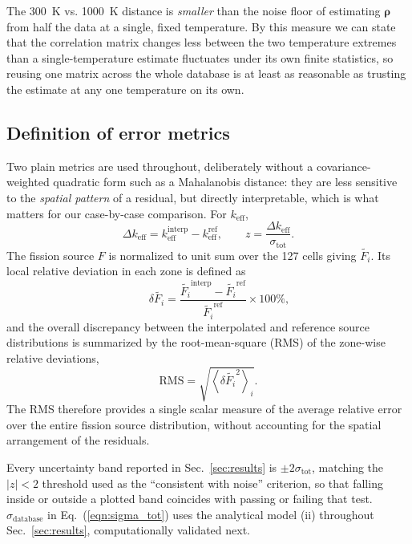 \documentclass{style/nseJournal}
\begin{document}
The 300~K vs. 1000~K distance is \emph{smaller} than the noise floor of estimating $\boldsymbol\rho$ from half the data at a single, fixed temperature. By this measure we can state that the correlation matrix changes less between the two temperature extremes than a single-temperature estimate fluctuates under its own finite statistics, so reusing one matrix across the whole database is at least as reasonable as trusting the estimate at any one temperature on its own.


\subsection{Definition of error metrics}
\label{sec:metrics}

Two plain metrics are used throughout, deliberately without a covariance-weighted quadratic form such as a Mahalanobis distance: they are less sensitive to the \emph{spatial pattern} of a residual, but directly interpretable, which is what matters for our case-by-case comparison. For $k_{\text{eff}}$,
\begin{equation}
  \Delta k_{\text{eff}} = k_{\text{eff}}^{\text{interp}} - k_{\text{eff}}^{\text{ref}}, \qquad
  z = \frac{\Delta k_{\text{eff}}}{\sigma_{\text{tot}}} .
  \label{eqn:metrics_keff}
\end{equation}
The fission source $F$ is normalized to unit sum over the 127 cells giving $\tilde{F_i}$. Its local relative deviation in each zone is defined as
\begin{equation}
    \qquad  \delta \tilde{F_i} = \frac{\tilde{F_i}^{\text{interp}} - \tilde{F_i}^{\text{ref}}}{\tilde{F_i}^{\text{ref}}}\times 100\%,
  \label{eqn:metrics_fs_delta}
\end{equation}
and the overall discrepancy between the interpolated and reference source distributions is summarized by the root-mean-square (RMS) of the zone-wise relative deviations,
\begin{equation}
  \mathrm{RMS} = \sqrt{\left\langle \delta \tilde{F_i}^2 \right\rangle_i}.
  \label{eqn:metrics_fs}
\end{equation}
The RMS therefore provides a single scalar measure of the average relative error over the entire fission source distribution, without accounting for the spatial arrangement of the residuals.

Every uncertainty band reported in Sec.~\ref{sec:results} is $\pm2\sigma_{\text{tot}}$, matching the $|z|<2$ threshold used as the ``consistent with noise'' criterion, so that falling inside or outside a plotted band coincides with passing or failing that test. $\sigma_{\text{database}}$ in Eq.~(\ref{eqn:sigma_tot}) uses the analytical model (ii) throughout Sec.~\ref{sec:results}, computationally validated next.
\end{document}
